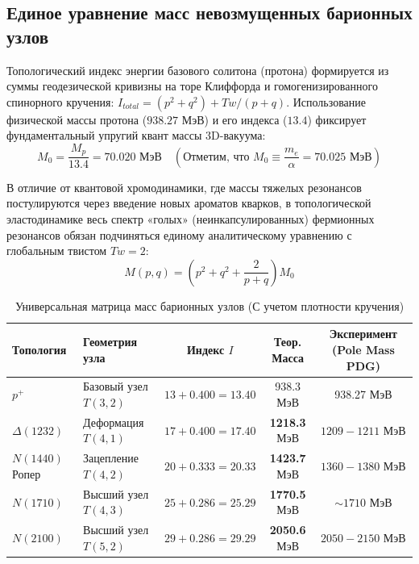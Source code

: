 \documentclass[12pt,a4paper]{article}
\begin{document}
	\subsection{Единое уравнение масс невозмущенных барионных узлов}
	Топологический индекс энергии базового солитона (протона) формируется из суммы геодезической кривизны на торе Клиффорда и гомогенизированного спинорного кручения: $I_{total} = (p^2+q^2) + Tw/(p+q)$.
	Использование физической массы протона ($938.27$ МэВ) и его индекса ($13.4$) фиксирует фундаментальный упругий квант массы 3D-вакуума:
	\begin{equation}
		M_0 = \frac{M_p}{13.4} = \mathbf{70.020 \text{ МэВ}} \quad \left( \text{Отметим, что } M_0 \equiv \frac{m_e}{\alpha} = 70.025 \text{ МэВ} \right)
	\end{equation}
	
	В отличие от квантовой хромодинамики, где массы тяжелых резонансов постулируются через введение новых ароматов кварков, в топологической эластодинамике весь спектр «голых» (неинкапсулированных) фермионных резонансов обязан подчиняться единому аналитическому уравнению с глобальным твистом $Tw=2$:
	\begin{equation}
		M(p,q) = \left( p^2 + q^2 + \frac{2}{p+q} \right) M_0
	\end{equation}
	
	\begin{table}[htbp]
		\centering
		\caption{Универсальная матрица масс барионных узлов (С учетом плотности кручения)}
		\renewcommand{\arraystretch}{1.4}
		\begin{tabular}{llccc}
			\toprule
			\textbf{Топология} & \textbf{Геометрия узла} & \textbf{Индекс $I$} & \textbf{Теор. Масса} & \textbf{Эксперимент (Pole Mass PDG)} \\
			\midrule
			$p^+$ & Базовый узел $T(3,2)$ & $13 + 0.400 = 13.40$ & 938.3 МэВ & 938.27 МэВ \\
			$\Delta(1232)$ & Деформация $T(4,1)$ & $17 + 0.400 = 17.40$ & \textbf{1218.3} МэВ & $1209 - 1211$ МэВ \\
			$N(1440)$ Ропер & Зацепление $T(4,2)$ & $20 + 0.333 = 20.33$ & \textbf{1423.7} МэВ & $1360 - 1380$ МэВ \\
			$N(1710)$ & Высший узел $T(4,3)$ & $25 + 0.286 = 25.29$ & \textbf{1770.5} МэВ & $\sim 1710$ МэВ \\
			$N(2100)$ & Высший узел $T(5,2)$ & $29 + 0.286 = 29.29$ & \textbf{2050.6} МэВ & $2050 - 2150$ МэВ \\
			\bottomrule
		\end{tabular}
		\label{tab:strict_baryons}
	\end{table}
	
\end{document}
